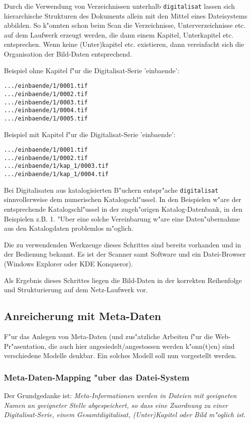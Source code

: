 \documentclass[11pt, twoside, a4paper, BCOR8mm, DIV12, bibtotoc,idxtotoc]{scrreprt}
\begin{document}
Durch die Verwendung von Verzeichnissen unterhalb \texttt{digitalisat}
lassen sich hierarchische Struk\-tu\-ren des Dokuments allein mit den
Mittel eines Dateisystems abbilden. So k"onnten schon beim Scan die
Verzeichnisse, Unterverzeich\-nis\-se etc. auf dem Laufwerk erzeugt
werden, die dann einem Kapitel, Unterkapitel etc.  entsprechen. Wenn
keine (Unter)kapitel etc.  existieren, dann vereinfacht sich die
Organisation der Bild-Daten entsprechend.


Beispiel ohne Kapitel f"ur die Digitalisat-Serie 'einbaende':
\begin{verbatim}
.../einbaende/1/0001.tif
.../einbaende/1/0002.tif
.../einbaende/1/0003.tif
.../einbaende/1/0004.tif
.../einbaende/1/0005.tif
\end{verbatim}

Beispiel mit Kapitel f"ur die Digitalisat-Serie 'einbaende':
\begin{verbatim}
.../einbaende/1/0001.tif
.../einbaende/1/0002.tif
.../einbaende/1/kap_1/0003.tif
.../einbaende/1/kap_1/0004.tif
\end{verbatim}

Bei Digitalisaten aus katalogisierten B"uchern entspr"ache
\texttt{digitalisat} sinnvollerweise dem nu\-mer\-ischen
Katalogschl"ussel. In den Beispielen w"are der entsprechende
Katalogschl"ussel in der zugeh"origen Katalog-Datenbank, in den
Beispielen z.B. 1. "Uber eine solche Vereinbarung w"are eine
Daten"uber\-nahme aus den Katalogdaten problemlos m"oglich.

Die zu verwendenden Werkzeuge dieses Schrittes sind bereits vorhanden
und in der Bedienung bekannt. Es ist der Scanner samt Software und ein
Datei-Browser (Windows Explorer oder KDE Konqueror).

Als Ergebnis dieses Schrittes liegen die Bild-Daten in der korrekten
Reihenfolge und Strukturierung auf dem Netz-Laufwerk vor.


\subsection{Anreicherung mit Meta-Daten}
F"ur das Anlegen von Meta-Daten (und zus"atzliche Arbeiten f"ur die
Web-Pr"asentation, die auch hier angesiedelt/angestossen werden
k"onn(t)en) sind verschiedene Modelle denkbar. Ein solches Modell soll
nun vorgestellt werden.


\subsubsection{Meta-Daten-Mapping "uber das Datei-System}
Der Grundgedanke ist: \emph{Meta-Informationen werden in Dateien mit
  geeigneten Namen an ge\-eig\-ne\-ter Stelle abgespeichert, so dass eine
  Zuordnung zu einer Digitalisat-Serie, einem Gesamt\-di\-gi\-ta\-li\-sat,
  (Unter)Kapitel oder Bild m"oglich ist.}
\end{document}
